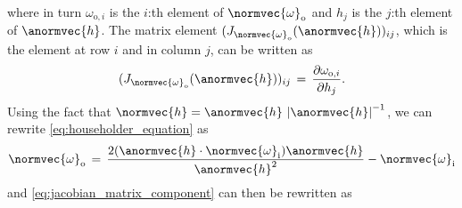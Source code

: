 %
where in turn $\omega_{\text{o},i}$ is the $i$:th element of $\normvec{\omega}_{\text{o}}$ and $h_{j}$ is the $j$:th element of $\anormvec{h}$. The matrix element $(J_{\normvec{\omega}_{\text{o}}}(\anormvec{h}))_{ij}$, which is the element at row $i$ and in column $j$, can be written as
%
\begin{equation} \label{eq:jacobian_matrix_component}
(J_{\normvec{\omega}_{\text{o}}}(\anormvec{h}))_{ij} \,=\, \frac{\partial\omega_{\text{o},i}}{\partial h_{j}}.
\end{equation}
%
Using the fact that $\normvec{h} = \anormvec{h}\,\left|\anormvec{h}\right|^{-1}$, we can rewrite \eqref{eq:householder_equation} as
%
\begin{equation} 
\normvec{\omega}_{\text{o}} \,=\, \frac{2(\anormvec{h}\cdot\normvec{\omega}_{\text{i}})\anormvec{h}}{\anormvec{h}^2} - \normvec{\omega}_{\text{i}}
\end{equation}
%
and \eqref{eq:jacobian_matrix_component} can then be rewritten as
%
